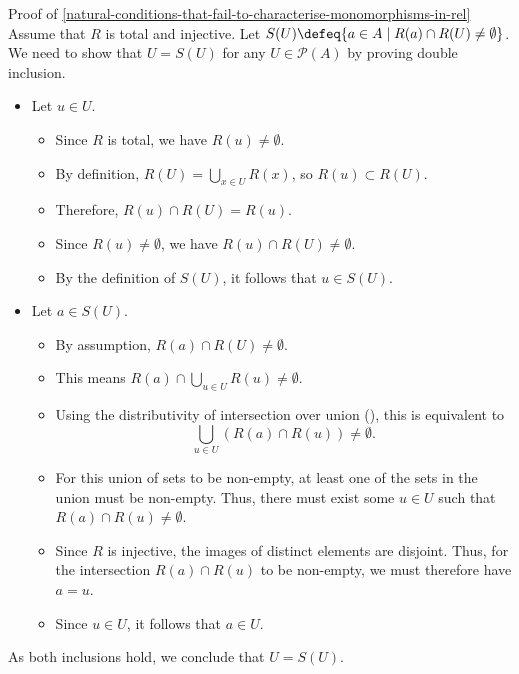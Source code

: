 \begin{Proof}{Proof of \cref{natural-conditions-that-fail-to-characterise-monomorphisms-in-rel}}
    Assume that $R$ is total and injective. Let $S(U)\defeq\{a\in A \mid R(a)\cap R(U)\neq\emptyset\}$. We need to show that $U = S(U)$ for any $U \in \mathcal{P}(A)$ by proving double inclusion.
    \begin{itemize}
        \item{}Let $u\in U$.
            \begin{itemize}
                \item Since $R$ is total, we have $R(u)\neq\emptyset$.
                \item By definition, $R(U)=\bigcup_{x\in U}R(x)$, so $R(u)\subset R(U)$.
                \item Therefore, $R(u)\cap R(U)=R(u)$.
                \item Since $R(u)\neq\emptyset$, we have $R(u)\cap R(U)\neq\emptyset$.
                \item By the definition of $S(U)$, it follows that $u\in S(U)$.
            \end{itemize}
        \item{}Let $a\in S(U)$.
            \begin{itemize}
                \item By assumption, $R(a)\cap R(U)\neq\emptyset$.
                \item This means $R(a)\cap\bigcup_{u\in U}R(u)\neq\emptyset$.
                \item Using the distributivity of intersection over union (), this is equivalent to
                    \[
                        \bigcup_{u\in U}(R(a)\cap R(u))%
                        \neq%
                        \emptyset.%
                    \]%
                \item For this union of sets to be non-empty, at least one of the sets in the union must be non-empty. Thus, there must exist some $u\in U$ such that $R(a)\cap R(u)\neq\emptyset$.
                \item Since $R$ is injective, the images of distinct elements are disjoint. Thus, for the intersection $R(a)\cap R(u)$ to be non-empty, we must therefore have $a=u$.
                \item Since $u\in U$, it follows that $a\in U$.
            \end{itemize}
    \end{itemize}
    As both inclusions hold, we conclude that $U=S(U)$.


\end{Proof}
